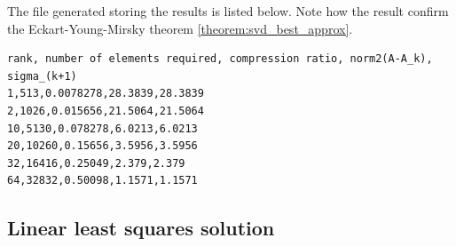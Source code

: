 \documentclass[a4paper]{article}
\numberwithin{equation}{section} %
\newcounter{solution}
\begin{document}
\inputminted{octave}{svd_compr.m}
The file generated storing the results is listed below. Note how the result confirm the Eckart-Young-Mirsky theorem \ref{theorem:svd_best_approx}.
\begin{verbatim}
rank, number of elements required, compression ratio, norm2(A-A_k), sigma_(k+1)
1,513,0.0078278,28.3839,28.3839
2,1026,0.015656,21.5064,21.5064
10,5130,0.078278,6.0213,6.0213
20,10260,0.15656,3.5956,3.5956
32,16416,0.25049,2.379,2.379
64,32832,0.50098,1.1571,1.1571
\end{verbatim}






\newpage
\subsection{Linear least squares solution}
\label{app:least_squares}
\end{document}
